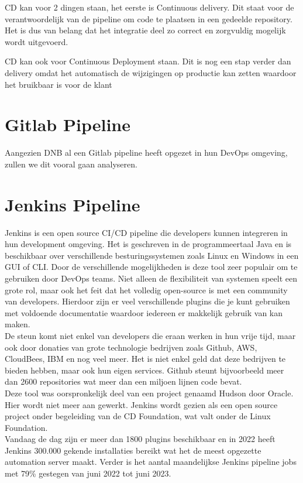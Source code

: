 CD kan voor 2 dingen staan, het eerste is Continuous delivery. Dit staat voor de verantwoordelijk van de pipeline om code te plaatsen in een gedeelde repository. Het is dus van belang dat het integratie deel zo correct en zorgvuldig mogelijk wordt uitgevoerd. 

CD kan ook voor Continuous Deployment staan. Dit is nog een stap verder dan delivery omdat het automatisch de wijzigingen op productie kan zetten waardoor het bruikbaar is voor de klant \autocite{RedHat2023} 

\section{Gitlab Pipeline}
Aangezien DNB al een Gitlab pipeline heeft opgezet in hun DevOps omgeving, zullen we dit vooral gaan analyseren.

\section{Jenkins Pipeline}
Jenkins is een open source CI/CD pipeline die developers kunnen integreren in hun development omgeving. Het is geschreven in de programmeertaal Java en is beschikbaar over verschillende besturingssystemen zoals Linux en Windows in een GUI of CLI. Door de verschillende mogelijkheden is deze tool zeer populair om te gebruiken door DevOps teams. Niet alleen de flexibiliteit van systemen speelt een grote rol, maar ook het feit dat het volledig open-source is met een community van developers. Hierdoor zijn er veel verschillende plugins die je kunt gebruiken met voldoende documentatie waardoor iedereen er makkelijk gebruik van kan maken. \autocite{Khan2021} \\
De steun komt niet enkel van developers die eraan werken in hun vrije tijd, maar ook door donaties van grote technologie bedrijven zoals Github, AWS, CloudBees, IBM en nog veel meer. Het is niet enkel geld dat deze bedrijven te bieden hebben, maar ook hun eigen services. Github steunt bijvoorbeeld meer dan 2600 repositories wat meer dan een miljoen lijnen code bevat. \autocite{CdFoundation2023} \\

Deze tool was oorspronkelijk deel van een project genaamd Hudson door Oracle. Hier wordt niet meer aan gewerkt. Jenkins wordt gezien als een open source project onder begeleiding van de CD Foundation, wat valt onder de Linux Foundation. \autocite{Riglian2019} \\
Vandaag de dag zijn er meer dan 1800 plugins beschikbaar en in 2022 heeft Jenkins 300.000 gekende installaties bereikt wat het de meest opgezette automation server maakt. Verder is het aantal maandelijkse Jenkins pipeline jobs met 79\% gestegen van juni 2022 tot juni 2023.  \autocite{CdFoundation2023}


